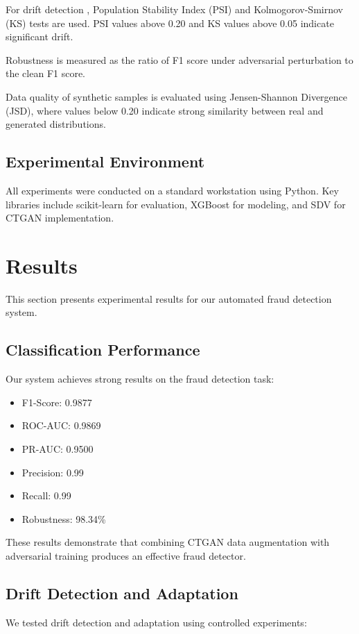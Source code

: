 \documentclass{svproc}
\begin{document}
For drift detection \cite{goudar2026adaptive}, Population Stability Index (PSI) and Kolmogorov-Smirnov (KS) tests are used. PSI values above 0.20 and KS values above 0.05 indicate significant drift.

Robustness is measured as the ratio of F1 score under adversarial perturbation to the clean F1 score.

Data quality of synthetic samples is evaluated using Jensen-Shannon Divergence (JSD), where values below 0.20 indicate strong similarity between real and generated distributions.

\subsection{Experimental Environment}

All experiments were conducted on a standard workstation using Python. Key libraries include scikit-learn for evaluation, XGBoost for modeling, and SDV for CTGAN implementation.

\section{Results}\label{sec:results}
This section presents experimental results for our automated fraud detection system.

\subsection{Classification Performance}
Our system achieves strong results on the fraud detection task:
\begin{itemize}
  \item F1-Score: 0.9877
  \item ROC-AUC: 0.9869  
  \item PR-AUC: 0.9500
  \item Precision: 0.99
  \item Recall: 0.99
  \item Robustness: 98.34\%
\end{itemize}

These results demonstrate that combining CTGAN data augmentation with adversarial training produces an effective fraud detector.

\subsection{Drift Detection and Adaptation}
We tested drift detection and adaptation using controlled experiments:
\end{document}
